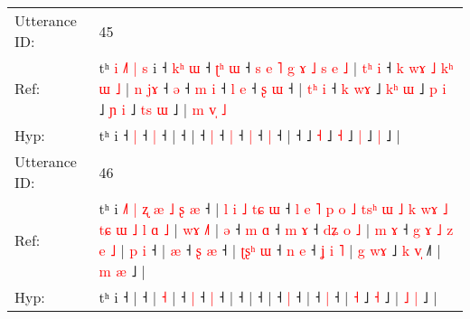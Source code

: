 \documentclass[10pt]{article}
\DeclareRobustCommand{\hl}[1]{{\textcolor{red}{#1}}}
\begin{document}
\begin{longtable}{ll}
 \\
\midrule
Utterance ID: & 45 \\
Ref: & tʰ\hl{ }\hl{i}\hl{ }\hl{˩}\hl{˥}\hl{ }\hl{|}\hl{ }\hl{s} i ˧\hl{ }\hl{k}\hl{ʰ} \hl{ɯ} ˧\hl{ }\hl{ʈ}\hl{ʰ} \hl{ɯ} ˧\hl{ }\hl{s}\hl{ }\hl{e}\hl{ }\hl{˥}\hl{ }\hl{g}\hl{ }\hl{ɤ}\hl{ }\hl{˩}\hl{ }\hl{s}\hl{ }\hl{e}\hl{ }\hl{˩} |\hl{ }\hl{t}\hl{ʰ}\hl{ }\hl{i} ˧\hl{ }\hl{k}\hl{ }\hl{w}\hl{ɤ}\hl{ }\hl{˩}\hl{ }\hl{k}\hl{ʰ}\hl{ }\hl{ɯ}\hl{ }\hl{˩} |\hl{ }\hl{n}\hl{ }\hl{j}\hl{ɤ} ˧ \hl{ə} ˧\hl{ }\hl{m} \hl{i} ˧\hl{ }\hl{l} \hl{e} ˧\hl{ }\hl{ʂ} \hl{ɯ} ˧ |\hl{ }\hl{t}\hl{ʰ}\hl{ }\hl{i} ˧\hl{ }\hl{k}\hl{ }\hl{w}\hl{ɤ} ˩\hl{ }\hl{k}\hl{ʰ} \hl{ɯ} ˩\hl{ }\hl{p} \hl{i} ˩\hl{ }\hl{ɲ} \hl{i} ˩\hl{ }\hl{t}\hl{s} \hl{ɯ} ˩ |\hl{ }\hl{m}\hl{ }\hl{v}\hl{̩}\hl{ }\hl{˩}
 \\
Hyp: & tʰ\hl{}\hl{}\hl{}\hl{}\hl{}\hl{}\hl{}\hl{}\hl{} i ˧\hl{}\hl{}\hl{} \hl{|} ˧\hl{}\hl{}\hl{} \hl{|} ˧\hl{}\hl{}\hl{}\hl{}\hl{}\hl{}\hl{}\hl{}\hl{}\hl{}\hl{}\hl{}\hl{}\hl{}\hl{}\hl{}\hl{}\hl{} |\hl{}\hl{}\hl{}\hl{}\hl{} ˧\hl{}\hl{}\hl{}\hl{}\hl{}\hl{}\hl{}\hl{}\hl{}\hl{}\hl{}\hl{}\hl{}\hl{} |\hl{}\hl{}\hl{}\hl{}\hl{} ˧ \hl{|} ˧\hl{}\hl{} \hl{|} ˧\hl{}\hl{} \hl{|} ˧\hl{}\hl{} \hl{|} ˧ |\hl{}\hl{}\hl{}\hl{}\hl{} ˧\hl{}\hl{}\hl{}\hl{}\hl{} ˩\hl{}\hl{}\hl{} \hl{˧} ˩\hl{}\hl{} \hl{˧} ˩\hl{}\hl{} \hl{|} ˩\hl{}\hl{}\hl{} \hl{|} ˩ |\hl{}\hl{}\hl{}\hl{}\hl{}\hl{}\hl{}
 \\
\midrule
Utterance ID: & 46 \\
Ref: & tʰ i\hl{ }\hl{˩}\hl{˥}\hl{ }\hl{|}\hl{ }\hl{ʐ}\hl{ }\hl{æ}\hl{ }\hl{˩}\hl{ }\hl{ʂ}\hl{ }\hl{æ} ˧ |\hl{ }\hl{l}\hl{ }\hl{i}\hl{ }\hl{˩}\hl{ }\hl{t}\hl{ɕ}\hl{ }\hl{ɯ} ˧\hl{ }\hl{l}\hl{ }\hl{e}\hl{ }\hl{˥}\hl{ }\hl{p}\hl{ }\hl{o}\hl{ }\hl{˩}\hl{ }\hl{t}\hl{s}\hl{ʰ}\hl{ }\hl{ɯ}\hl{ }\hl{˩}\hl{ }\hl{k}\hl{ }\hl{w}\hl{ɤ}\hl{ }\hl{˩}\hl{ }\hl{t}\hl{ɕ}\hl{ }\hl{ɯ}\hl{ }\hl{˩}\hl{ }\hl{l}\hl{ }\hl{ɑ}\hl{ }\hl{˩} |\hl{ }\hl{w}\hl{ɤ} \hl{˩}\hl{˥} |\hl{ }\hl{ə} ˧\hl{ }\hl{m} \hl{ɑ} ˧\hl{ }\hl{m} \hl{ɤ} ˧\hl{ }\hl{d}\hl{ʑ}\hl{ }\hl{o}\hl{ }\hl{˩} |\hl{ }\hl{m}\hl{ }\hl{ɤ} ˧\hl{ }\hl{g}\hl{ }\hl{ɤ}\hl{ }\hl{˩}\hl{ }\hl{z}\hl{ }\hl{e}\hl{ }\hl{˩} |\hl{ }\hl{p}\hl{ }\hl{i} ˧ |\hl{ }\hl{æ} ˧\hl{ }\hl{ʂ} \hl{æ} ˧ |\hl{ }\hl{ʈ}\hl{ʂ}\hl{ʰ}\hl{ }\hl{ɯ} ˧\hl{ }\hl{n} \hl{e} ˧\hl{ }\hl{ʝ}\hl{ }\hl{i}\hl{ }\hl{˥} |\hl{ }\hl{g} \hl{w}\hl{ɤ} ˩\hl{ }\hl{k} \hl{v}\hl{̩} ˩\hl{˥} | \hl{m} \hl{æ} ˩ |
 \\
Hyp: & tʰ i\hl{}\hl{}\hl{}\hl{}\hl{}\hl{}\hl{}\hl{}\hl{}\hl{}\hl{}\hl{}\hl{}\hl{}\hl{} ˧ |\hl{}\hl{}\hl{}\hl{}\hl{}\hl{}\hl{}\hl{}\hl{}\hl{}\hl{} ˧\hl{}\hl{}\hl{}\hl{}\hl{}\hl{}\hl{}\hl{}\hl{}\hl{}\hl{}\hl{}\hl{}\hl{}\hl{}\hl{}\hl{}\hl{}\hl{}\hl{}\hl{}\hl{}\hl{}\hl{}\hl{}\hl{}\hl{}\hl{}\hl{}\hl{}\hl{}\hl{}\hl{}\hl{}\hl{}\hl{}\hl{}\hl{}\hl{}\hl{} |\hl{}\hl{}\hl{} \hl{}\hl{˧} |\hl{}\hl{} ˧\hl{}\hl{} \hl{|} ˧\hl{}\hl{} \hl{|} ˧\hl{}\hl{}\hl{}\hl{}\hl{}\hl{}\hl{} |\hl{}\hl{}\hl{}\hl{} ˧\hl{}\hl{}\hl{}\hl{}\hl{}\hl{}\hl{}\hl{}\hl{}\hl{}\hl{}\hl{} |\hl{}\hl{}\hl{}\hl{} ˧ |\hl{}\hl{} ˧\hl{}\hl{} \hl{|} ˧ |\hl{}\hl{}\hl{}\hl{}\hl{}\hl{} ˧\hl{}\hl{} \hl{|} ˧\hl{}\hl{}\hl{}\hl{}\hl{}\hl{} |\hl{}\hl{} \hl{}\hl{˧} ˩\hl{}\hl{} \hl{}\hl{˧} ˩\hl{} | \hl{˩} \hl{|} ˩ |

\end{longtable}
\end{document}
